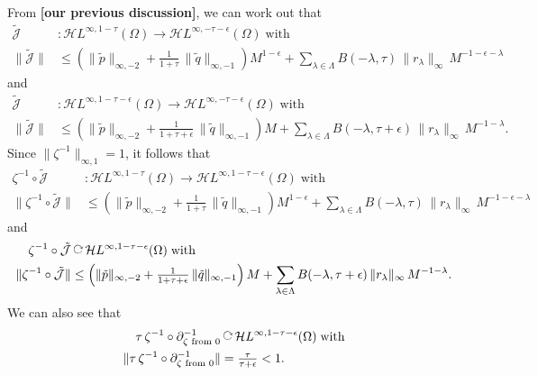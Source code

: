 \documentclass{article}
\theoremstyle{plain}
\newcommand{\maps}{\colon}
\newcommand{\acts}{\mathbin{\raisebox{\depth}{\rotatebox{-90}{$\circlearrowright$}}}}
\newcommand{\holoL}[1]{\mathcal{H}L^{#1}} %
\begin{document}
From \textbf{[our previous discussion]}, we can work out that
\begin{align*}
\tilde{\mathcal{J}} & \maps \holoL{\infty, 1-\tau}(\Omega) \to \holoL{\infty, -\tau-\epsilon}(\Omega)\;\text{with} \\
\|\tilde{\mathcal{J}}\| & \le \left(\|\tilde{p}\|_{\infty, -2} + \tfrac{1}{1+\tau}\,\|\tilde{q}\|_{\infty, -1} \right) M^{1-\epsilon} + \sum_{\lambda \in \Lambda} B(-\lambda, \tau)\,\|r_\lambda\|_{\infty}\,M^{-1-\epsilon-\lambda}
\end{align*}
and
\begin{align*}
\tilde{\mathcal{J}} & \maps \holoL{\infty, 1-\tau-\epsilon}(\Omega) \to \holoL{\infty, -\tau-\epsilon}(\Omega)\;\text{with} \\
\|\tilde{\mathcal{J}}\| & \le \left(\|\tilde{p}\|_{\infty, -2} + \tfrac{1}{1+\tau+\epsilon}\,\|\tilde{q}\|_{\infty, -1} \right) M + \sum_{\lambda \in \Lambda} B(-\lambda, \tau+\epsilon)\,\|r_\lambda\|_{\infty}\,M^{-1-\lambda}.
\end{align*}
Since $\|\zeta^{-1}\|_{\infty, 1} = 1$, it follows that
\begin{align}
\zeta^{-1} \circ \tilde{\mathcal{J}} & \maps \holoL{\infty, 1-\tau}(\Omega) \to \holoL{\infty, 1-\tau-\epsilon}(\Omega)\;\text{with} \nonumber \\
\|\zeta^{-1} \circ \tilde{\mathcal{J}}\| & \le \left(\|\tilde{p}\|_{\infty, -2} + \tfrac{1}{1+\tau}\,\|\tilde{q}\|_{\infty, -1} \right) M^{1-\epsilon} + \sum_{\lambda \in \Lambda} B(-\lambda, \tau)\,\|r_\lambda\|_{\infty}\,M^{-1-\epsilon-\lambda} \label{bound:mollify}
\end{align}
and
\begin{align}
\zeta^{-1} \circ \tilde{\mathcal{J}} & \acts \holoL{\infty, 1-\tau-\epsilon}(\Omega)\;\text{with} \nonumber \\
\|\zeta^{-1} \circ \tilde{\mathcal{J}}\| & \le \left(\|\tilde{p}\|_{\infty, -2} + \tfrac{1}{1+\tau+\epsilon}\,\|\tilde{q}\|_{\infty, -1} \right) M + \sum_{\lambda \in \Lambda} B(-\lambda, \tau+\epsilon)\,\|r_\lambda\|_{\infty}\,M^{-1-\lambda}. \label{bound:perturb}
\end{align}
We can also see that
\begin{align}
\tau\,\zeta^{-1} \circ \partial^{-1}_{\zeta \text{ from } 0} & \acts \holoL{\infty, 1-\tau-\epsilon}(\Omega)\;\text{with} \nonumber \\
\|\tau\,\zeta^{-1} \circ \partial^{-1}_{\zeta \text{ from } 0}\| & = \tfrac{\tau}{\tau+\epsilon} < 1 \label{bound:contract}.
\end{align}
\end{document}
